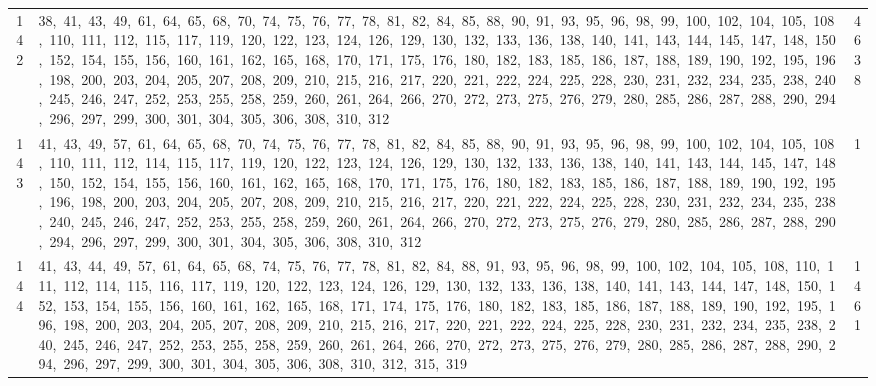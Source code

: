 \begin{longtable}{c|p{}|r}
142 & 38,\ 41,\ 43,\ 49,\ 61,\ 64,\ 65,\ 68,\ 70,\ 74,\ 75,\ 76,\ 77,\ 78,\ 81,\ 82,\ 84,\ 85,\ 88,\ 90,\ 91,\ 93,\ 95,\ 96,\ 98,\ 99,\ 100,\ 102,\ 104,\ 105,\ 108,\ 110,\ 111,\ 112,\ 115,\ 117,\ 119,\ 120,\ 122,\ 123,\ 124,\ 126,\ 129,\ 130,\ 132,\ 133,\ 136,\ 138,\ 140,\ 141,\ 143,\ 144,\ 145,\ 147,\ 148,\ 150,\ 152,\ 154,\ 155,\ 156,\ 160,\ 161,\ 162,\ 165,\ 168,\ 170,\ 171,\ 175,\ 176,\ 180,\ 182,\ 183,\ 185,\ 186,\ 187,\ 188,\ 189,\ 190,\ 192,\ 195,\ 196,\ 198,\ 200,\ 203,\ 204,\ 205,\ 207,\ 208,\ 209,\ 210,\ 215,\ 216,\ 217,\ 220,\ 221,\ 222,\ 224,\ 225,\ 228,\ 230,\ 231,\ 232,\ 234,\ 235,\ 238,\ 240,\ 245,\ 246,\ 247,\ 252,\ 253,\ 255,\ 258,\ 259,\ 260,\ 261,\ 264,\ 266,\ 270,\ 272,\ 273,\ 275,\ 276,\ 279,\ 280,\ 285,\ 286,\ 287,\ 288,\ 290,\ 294,\ 296,\ 297,\ 299,\ 300,\ 301,\ 304,\ 305,\ 306,\ 308,\ 310,\ 312 & 4638 \\
143 & 41,\ 43,\ 49,\ 57,\ 61,\ 64,\ 65,\ 68,\ 70,\ 74,\ 75,\ 76,\ 77,\ 78,\ 81,\ 82,\ 84,\ 85,\ 88,\ 90,\ 91,\ 93,\ 95,\ 96,\ 98,\ 99,\ 100,\ 102,\ 104,\ 105,\ 108,\ 110,\ 111,\ 112,\ 114,\ 115,\ 117,\ 119,\ 120,\ 122,\ 123,\ 124,\ 126,\ 129,\ 130,\ 132,\ 133,\ 136,\ 138,\ 140,\ 141,\ 143,\ 144,\ 145,\ 147,\ 148,\ 150,\ 152,\ 154,\ 155,\ 156,\ 160,\ 161,\ 162,\ 165,\ 168,\ 170,\ 171,\ 175,\ 176,\ 180,\ 182,\ 183,\ 185,\ 186,\ 187,\ 188,\ 189,\ 190,\ 192,\ 195,\ 196,\ 198,\ 200,\ 203,\ 204,\ 205,\ 207,\ 208,\ 209,\ 210,\ 215,\ 216,\ 217,\ 220,\ 221,\ 222,\ 224,\ 225,\ 228,\ 230,\ 231,\ 232,\ 234,\ 235,\ 238,\ 240,\ 245,\ 246,\ 247,\ 252,\ 253,\ 255,\ 258,\ 259,\ 260,\ 261,\ 264,\ 266,\ 270,\ 272,\ 273,\ 275,\ 276,\ 279,\ 280,\ 285,\ 286,\ 287,\ 288,\ 290,\ 294,\ 296,\ 297,\ 299,\ 300,\ 301,\ 304,\ 305,\ 306,\ 308,\ 310,\ 312 & 1 \\
144 & 41,\ 43,\ 44,\ 49,\ 57,\ 61,\ 64,\ 65,\ 68,\ 74,\ 75,\ 76,\ 77,\ 78,\ 81,\ 82,\ 84,\ 88,\ 91,\ 93,\ 95,\ 96,\ 98,\ 99,\ 100,\ 102,\ 104,\ 105,\ 108,\ 110,\ 111,\ 112,\ 114,\ 115,\ 116,\ 117,\ 119,\ 120,\ 122,\ 123,\ 124,\ 126,\ 129,\ 130,\ 132,\ 133,\ 136,\ 138,\ 140,\ 141,\ 143,\ 144,\ 147,\ 148,\ 150,\ 152,\ 153,\ 154,\ 155,\ 156,\ 160,\ 161,\ 162,\ 165,\ 168,\ 171,\ 174,\ 175,\ 176,\ 180,\ 182,\ 183,\ 185,\ 186,\ 187,\ 188,\ 189,\ 190,\ 192,\ 195,\ 196,\ 198,\ 200,\ 203,\ 204,\ 205,\ 207,\ 208,\ 209,\ 210,\ 215,\ 216,\ 217,\ 220,\ 221,\ 222,\ 224,\ 225,\ 228,\ 230,\ 231,\ 232,\ 234,\ 235,\ 238,\ 240,\ 245,\ 246,\ 247,\ 252,\ 253,\ 255,\ 258,\ 259,\ 260,\ 261,\ 264,\ 266,\ 270,\ 272,\ 273,\ 275,\ 276,\ 279,\ 280,\ 285,\ 286,\ 287,\ 288,\ 290,\ 294,\ 296,\ 297,\ 299,\ 300,\ 301,\ 304,\ 305,\ 306,\ 308,\ 310,\ 312,\ 315,\ 319 & 1461 \\

\end{longtable}
